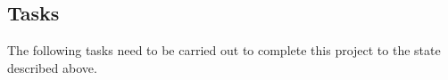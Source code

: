 \documentclass[12pt,a4paper,twoside]{article}
\begin{document}
	
	\subsection*{Tasks}
	
	The following tasks need to be carried out to complete this project to the state described above.
	
\end{document}
